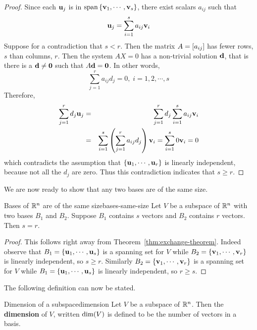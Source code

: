 \begin{proof}
Since each $\mbox{\bf u}_j$ is in $\sspan\set{\vect{v}_{1},\cdots ,\vect{v}_{s}} 
$, there exist scalars $a_{ij}$ such that 
\begin{equation*}
\mbox{\bf u}_{j}=\sum_{i=1}^{s}a_{ij}\mbox{\bf v}_{i}
\end{equation*}
Suppose for a contradiction that $s<r$. Then the matrix $A = \left[
a_{ij} \right]$ has fewer rows, $s$ than columns, $r$. Then the system
$AX=0$ has %
a non-trivial solution $\mbox{\bf d}$, that is there is a  $\mbox{\bf d}\neq \mbox{\bf 0}$ such that  $A\mbox{\bf d}=\mbox{\bf 0}$. In other
words, 
\begin{equation*}
\sum_{j=1}^{r}a_{ij}d_{j}=0,\;i=1,2,\cdots ,s
\end{equation*}
Therefore, 
\begin{eqnarray*}
\sum_{j=1}^{r}d_{j}\mbox{\bf u}_{j} &=&\sum_{j=1}^{r}d_{j}\sum_{i=1}^{s}a_{ij}
\mbox{\bf v}_{i} \\
&=&\sum_{i=1}^{s}\left(\sum_{j=1}^{r}a_{ij}d_{j}\right) \mbox{\bf v}
_{i}=\sum_{i=1}^{s}0\mbox{\bf v}_{i}=0
\end{eqnarray*}
which contradicts the assumption that $\left\{\mbox{\bf u}_{1},\cdots ,\mbox{\bf u}_{r}\right\} $
is linearly independent, because not all the $d_{j}$ are zero. Thus this contradiction indicates that $s\geq r$. 
\end{proof}

We are now ready to show that any two bases are of the same size. 

\begin{theorem}{Bases of $\mathbb{R}^{n}$ are of the same size}{bases-same-size}
Let $V$ be a subspace of $\mathbb{R}^{n}$ with two bases $B_1$ and $B_2$. Suppose $B_1$ contains $s$ vectors and $B_2$ contains $r$ vectors. Then $s=r$.
\end{theorem}

\begin{proof}
This follows right away from Theorem~\ref{thm:exchange-theorem}. Indeed
observe that $B_1 = \left\{
\mbox{\bf u}_{1},\cdots ,\mbox{\bf u}_{s}\right\} $ is a spanning set for $V$ while $
B_2 = \left\{\mbox{\bf v}_{1},\cdots ,\mbox{\bf v}_{r}\right\} $ is linearly
independent, so $s \geq r$. Similarly $B_2 = \left\{\mbox{\bf v}_{1},\cdots ,\mbox{\bf v}
_{r}\right\} $ is a spanning set for $V$ while $B_1 = \left\{\mbox{\bf u}_{1},\cdots ,
\mbox{\bf u}_{s}\right\} $ is linearly independent,  so $r\geq s$.
\end{proof}

The following definition can now be stated.

\begin{definition}{Dimension of a subspace}{dimension}
Let $V$ be a subspace of $\mathbb{R}^{n}$. Then the \textbf{dimension }of $V$, written $\mbox{\rm dim}(V)$
is defined to be the number of vectors in a basis.
\end{definition}

